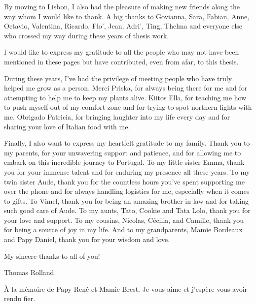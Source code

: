 By moving to Lisbon, I also had the pleasure of making new friends along the way whom I would like to thank. A big thanks to Govianna, Sara, Fabian, Anne, Octavio, Valentina, Ricardo, Flo', Jean, Adri', Ting, Thelma and everyone else who crossed my way during these years of thesis work. 

I would like to express my gratitude to all the people who may not have been mentioned in these pages but have contributed, even from afar, to this thesis.

During these years, I've had the privilege of meeting people who have truly helped me grow as a person. Merci Priska, for always being there for me and for attempting to help me to keep my plants alive. Kiitos Ella, for teaching me how to push myself out of my comfort zone and for trying to spot northern lights with me. Obrigado Patricia, for bringing laughter into my life every day and for sharing your love of Italian food with me.

Finally, I also want to express my heartfelt gratitude to my family. Thank you to my parents, for your unwavering support and patience, and for allowing me to embark on this incredible journey to Portugal. To my little sister Emma, thank you for your immense talent and for enduring my presence all these years. To my twin sister Aude, thank you for the countless hours you've spent supporting me over the phone and for always handling logistics for me, especially when it comes to gifts. To Vimel, thank you for being an amazing brother-in-law and for taking such good care of Aude. To my aunts, Tato, Cookie and Tata Lolo, thank you for your love and support. To my cousins, Nicolas, Cécilia, and Camille, thank you for being a source of joy in my life. And to my grandparents, Mamie Bordeaux and Papy Daniel, thank you for your wisdom and love.

My sincere thanks to all of you!

\vspace{1cm}
Thomas Rolland
\vspace*{\fill}
\begin{flushright}
    À la mémoire de Papy René et Mamie Brest. Je vous aime et j'espère vous avoir rendu fier.
\end{flushright}